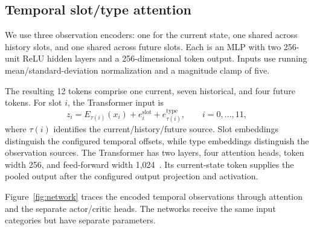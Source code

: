 \subsection{Temporal slot/type attention}\label{sec:architecture}

We use three observation encoders: one for the current state, one shared
across history slots, and one shared across future slots. Each is an MLP
with two 256-unit ReLU hidden layers and a 256-dimensional token output.
Inputs use running mean/standard-deviation normalization and a magnitude
clamp of five.

The resulting 12 tokens comprise one current, seven historical, and four
future tokens. For slot $i$, the Transformer input is
\begin{equation}
    z_i = E_{\tau(i)}(x_i)
        + e_i^{\mathrm{slot}} + e_{\tau(i)}^{\mathrm{type}},
    \qquad i=0,\ldots,11,
    \label{eq:token_embedding}
\end{equation}
where $\tau(i)$ identifies the current/history/future source.
Slot embeddings distinguish the configured temporal offsets, while type
embeddings distinguish the observation sources. The Transformer has two
layers, four attention heads, token width 256, and feed-forward width
1,024~\cite{attention}. Its current-state token supplies the pooled output
after the configured output projection and activation.

Figure~\ref{fig:network} traces the encoded temporal observations through
attention and the separate actor/critic heads. The networks receive the same
input categories but have separate parameters.

